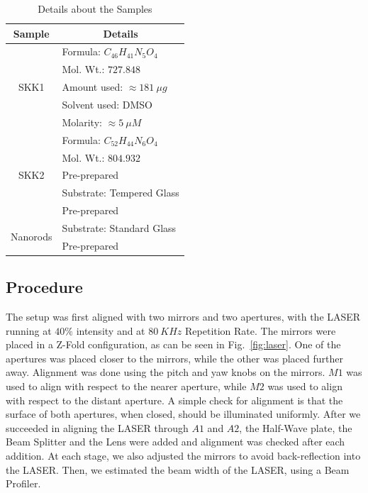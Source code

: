\documentclass[%
 reprint,
amsmath,
amssymb,
10pt
]{revtex4-2}
\begin{document}
\begin{table}
 \begin{tabular}{c|l} 
 \hline\hline
 \textbf{Sample} & \multicolumn{1}{c}{\textbf{Details}} \\
 \hline
 \multirow{5}{*}{SKK1} & Formula: $C_{46}H_{41}N_5O_4$ \\
 & Mol. Wt.: $727.848$ \\
 & Amount used: $\approx 181\:\mu g$ \\
 & Solvent used: DMSO \\
 & Molarity: $\approx5\:\mu M$ \\
 \hline
 \multirow{5}{*}[\normalbaselineskip]{SKK2} & Formula: $C_{52}H_{44}N_6O_4$ \\
 & Mol. Wt.: $804.932$ \\
 & Pre-prepared \\
 \hline
 \multirow{2}{*}{Nanorods} & Substrate: Tempered Glass \\
 & Pre-prepared \\
 \hline
 \multirow{2}{*}{Nanorods} & Substrate: Standard Glass \\
 & Pre-prepared \\
 \hline\hline
\end{tabular}
\caption{Details about the Samples}
\label{table:sampdets}
\end{table}

\subsection{\label{proc}Procedure}

The setup was first aligned with two mirrors and two apertures, with the LASER running at $40\%$ intensity and at $80\:KHz$ Repetition Rate. The mirrors were placed in a Z-Fold configuration, as can be seen in Fig.~\ref{fig:laser}. One of the apertures was placed closer to the mirrors, while the other was placed further away. Alignment was done using the pitch and yaw knobs on the mirrors. $M1$ was used to align with respect to the nearer aperture, while $M2$ was used to align with respect to the distant aperture. A simple check for alignment is that the surface of both apertures, when closed, should be illuminated uniformly. After we succeeded in aligning the LASER through $A1$ and $A2$, the Half-Wave plate, the Beam Splitter and the Lens were added and alignment was checked after each addition. At each stage, we also adjusted the mirrors to avoid back-reflection into the LASER. Then, we estimated the beam width of the LASER, using a Beam Profiler.\\
\end{document}

